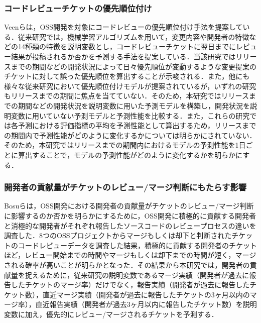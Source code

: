 \documentclass[submit]{ipsj}
\begin{document}
\subsubsection{コードレビューチケットの優先順位付け}
Veen\cite{prioritizer}らは，OSS開発を対象にコードレビューの優先順位付け手法を提案している．従来研究では，機械学習アルゴリズムを用いて，変更内容や開発者の特徴などの14種類の特徴を説明変数とし，コードレビューチケットに翌日までにレビュー結果が投稿されるか否かを予測する手法を提案している．当該研究ではリリースまでの期間などの開発状況によって日々優先順位が変動するような変更提案のチケットに対して誤った優先順位を算出することが示唆される．また，他にも様々な従来研究\cite{review_prioritize_pineapple}\cite{prioritize_azeem}\cite{prioritize_fan}において優先順位付けモデルが提案されているが，いずれの研究もリリースまでの期間に焦点を当てていない．そのため，本研究ではリリースまでの期間などの開発状況を説明変数に用いた予測モデルを構築し，開発状況を説明変数に用いていない予測モデルと予測性能を比較する．また，これらの研究\cite{prioritizer}\cite{review_prioritize_pineapple}\cite{prioritize_azeem}\cite{prioritize_fan}では各予測における評価指標の平均を予測性能として算出するため，リリースまでの期間内で予測性能がどのように変化するかについては明らかにされていない．そのため，本研究ではリリースまでの期間内におけるモデルの予測性能を1日ごとに算出することで，モデルの予測性能がどのように変化するかを明らかにする．

\subsubsection{開発者の貢献量がチケットのレビュー/マージ判断にもたらす影響}
Bosu\cite{review1}らは，OSS開発における開発者の貢献量がチケットのレビュー/マージ判断に影響するのか否かを明らかにするために，OSS開発に積極的に貢献する開発者と消極的な開発者がそれぞれ報告したソースコードのレビュープロセスの違いを調査した．8つのOSSプロジェクトからマージもしくは却下と判断されたチケットのコードレビューデータを調査した結果，積極的に貢献する開発者のチケットほど，レビュー開始までの時間やマージもしくは却下までの時間が短く，マージされる確率が高いことが明らかとなった．その結果から本研究では，開発者の貢献量を捉えるために，従来研究\cite{prioritizer}の説明変数であるマージ実績（開発者が過去に報告したチケットのマージ率）だけでなく，報告実績（開発者が過去に報告したチケット数），直近マージ実績（開発者が過去に報告したチケットの3ヶ月以内のマージ率），直近報告実績（開発者が過去3ヶ月以内に報告したチケット数）を説明変数に加え，優先的にレビュー/マージされるチケットを予測する．
\end{document}
